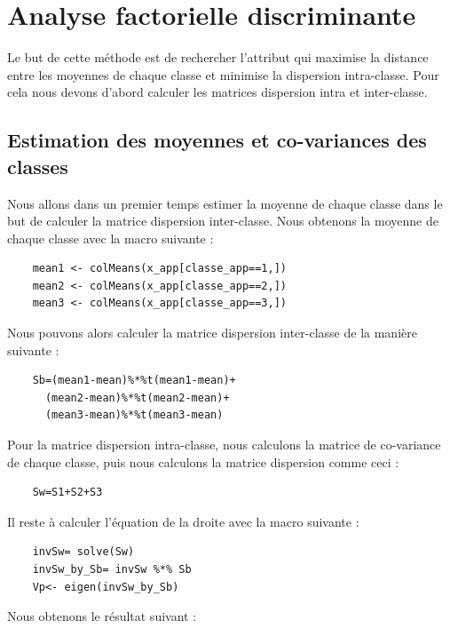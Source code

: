 \documentclass[a4paper,11pt]{article}
\begin{document}
  \section{Analyse factorielle discriminante}
  
  Le but de cette méthode est de rechercher l'attribut qui maximise la distance entre
  les moyennes de chaque classe et minimise la dispersion intra-classe. Pour cela nous
  devons d'abord calculer les matrices dispersion intra et inter-classe.
  
  \subsection{Estimation des moyennes et co-variances des classes}
  Nous allons dans un premier temps estimer la moyenne de chaque classe dans le but
  de calculer la matrice dispersion inter-classe. Nous obtenons la moyenne de chaque 
  classe avec la macro suivante : 
  
  \begin{lstlisting}
    mean1 <- colMeans(x_app[classe_app==1,])
    mean2 <- colMeans(x_app[classe_app==2,])
    mean3 <- colMeans(x_app[classe_app==3,])
  \end{lstlisting}

  Nous pouvons alors calculer la matrice dispersion inter-classe de la manière suivante :
  
  \begin{lstlisting}
    Sb=(mean1-mean)%*%t(mean1-mean)+
      (mean2-mean)%*%t(mean2-mean)+
      (mean3-mean)%*%t(mean3-mean)
  \end{lstlisting}
  
  Pour la matrice dispersion intra-classe, nous calculons la matrice de co-variance de chaque
  classe, puis nous calculons la matrice dispersion comme ceci : 
  
  \begin{lstlisting}
    Sw=S1+S2+S3
  \end{lstlisting}
  
  Il reste à calculer l'équation de la droite avec la macro suivante : 
  
  \begin{lstlisting}
    invSw= solve(Sw)
    invSw_by_Sb= invSw %*% Sb
    Vp<- eigen(invSw_by_Sb)
  \end{lstlisting}
  
  Nous obtenons le résultat suivant : 
  
\end{document}
